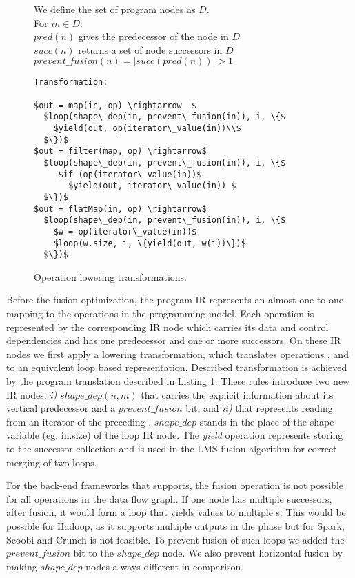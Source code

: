 \begin{figure}[!ht]
We define the set of program  nodes as $D$.\\
For $in \in D$:\\
 $pred(n)$ gives the predecessor of the node in $D$\\
 $succ(n)$ returns a set of node successors in $D$\\
 $prevent\_fusion(n) =  |succ(pred(n))| > 1$\\

\begin{lstlisting}
Transformation:

$out = map(in, op) \rightarrow  $
  $loop(shape\_dep(in, prevent\_fusion(in)), i, \{$
    $yield(out, op(iterator\_value(in))\\$
  $\})$
$out = filter(map, op) \rightarrow$
  $loop(shape\_dep(in, prevent\_fusion(in)), i, \{$
     $if (op(iterator\_value(in))$
       $yield(out, iterator\_value(in)) $
  $\})$
$out = flatMap(in, op) \rightarrow$
  $loop(shape\_dep(in, prevent\_fusion(in)), i, \{$
    $w = op(iterator\_value(in))$
    $loop(w.size, i, \{yield(out, w(i))\})$
  $\})$
\end{lstlisting}
\label{lst:lowering}
\caption{Operation lowering transformations.}
\end{figure}

Before the fusion optimization, the program IR represents an almost one to one mapping to the operations in the programming model. Each operation is represented by the corresponding IR node which carries its data and control dependencies and has one predecessor and one or more successors. On these IR nodes we first apply a lowering transformation, which translates operations ,  and  to an equivalent loop based representation. Described transformation is achieved by the program translation described in Listing \ref{lst:lowering}. These rules introduce two new IR nodes: \emph{i)} $shape\_dep(n, m)$ that carries the explicit information about its vertical predecessor and a $prevent\_fusion$ bit, and \emph{ii)}  that represents reading from an iterator of the preceding . $shape\_dep$ stands in the place of the shape variable (eg. in.size) of the loop IR node. The \emph{yield} operation represents storing to the successor collection and is used in the LMS fusion algorithm for correct merging of two loops.

For the back-end frameworks that \tool supports, the fusion operation is not possible for all operations in the data flow graph. If one node has multiple successors, after fusion, it would form a loop that yields values to multiple s. This would be possible for Hadoop, as it supports multiple outputs in the  phase but for Spark, Scoobi and Crunch is not feasible. To prevent fusion of such loops we added the $prevent\_fusion$ bit to the $shape\_dep$ node. We also prevent horizontal fusion by making $shape\_dep$ nodes always different in comparison.  

